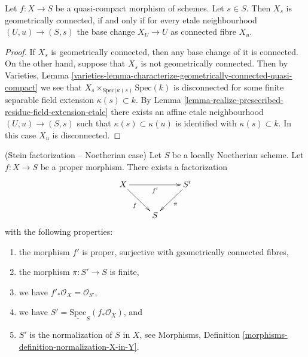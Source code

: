 \begin{lemma}
\label{lemma-characterize-geometrically-connected-fibres}
Let $f : X \to S$ be a quasi-compact morphism of schemes.
Let $s \in S$. Then $X_s$ is geometrically connected, if and
only if for every etale neighbourhood $(U, u) \to (S, s)$
the base change $X_U \to U$ as connected fibre $X_u$.
\end{lemma}

\begin{proof}
If $X_s$ is geometrically connected, then any base change of it is
connected. On the other hand, suppose that $X_s$ is not geometrically
connected. Then by
Varieties, Lemma
\ref{varieties-lemma-characterize-geometrically-connected-quasi-compact}
we see that $X_s \times_{\text{Spec}(\kappa(s)} \text{Spec}(k)$ is
disconnected for some
finite separable field extension $\kappa(s) \subset k$.
By Lemma \ref{lemma-realize-presecribed-residue-field-extension-etale}
there exists an affine etale neighbourhood $(U, u) \to (S, s)$ such that
$\kappa(s) \subset \kappa(u)$ is identified with $\kappa(s) \subset k$.
In this case $X_u$ is disconnected.
\end{proof}

\begin{theorem}
\label{theorem-stein-factorization-Noetherian}
(Stein factorization -- Noetherian case)
Let $S$ be a locally Noetherian scheme.
Let $f : X \to S$ be a proper morphism.
There exists a factorization
$$
\xymatrix{
X \ar[rr]_{f'} \ar[rd]_f & & S' \ar[dl]^\pi \\
& S &
}
$$
with the following properties:
\begin{enumerate}
\item the morphism $f'$ is proper, surjective
with geometrically connected fibres,
\item the morphism $\pi : S' \to S$ is finite,
\item we have $f'_*\mathcal{O}_X = \mathcal{O}_{S'}$,
\item we have $S' = \underline{\text{Spec}}_S(f_*\mathcal{O}_X)$, and
\item $S'$ is the normalization of $S$ in $X$, see
Morphisms, Definition \ref{morphisms-definition-normalization-X-in-Y}.
\end{enumerate}
\end{theorem}

